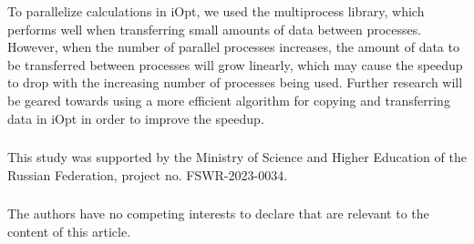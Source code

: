 \documentclass[runningheads]{llncs}
\begin{document}
To parallelize calculations in iOpt, we used the multiprocess library, which performs well when transferring small amounts of data between processes. However, when the number of parallel processes increases, the amount of data to be transferred between processes will grow linearly, which may cause the speedup to drop with the increasing number of processes being used. Further research will be geared towards  using a more efficient algorithm for copying and transferring data in iOpt in order to improve the speedup.


\begin{credits}
\subsubsection{\ackname} This study was supported by the Ministry of Science and Higher Education of the Russian Federation, project no. FSWR-2023-0034.

\subsubsection{\discintname}
The authors have no competing interests to declare that are relevant to the content of this article.
\end{credits}
%
%
%


%
%
%
%
%
\end{document}
